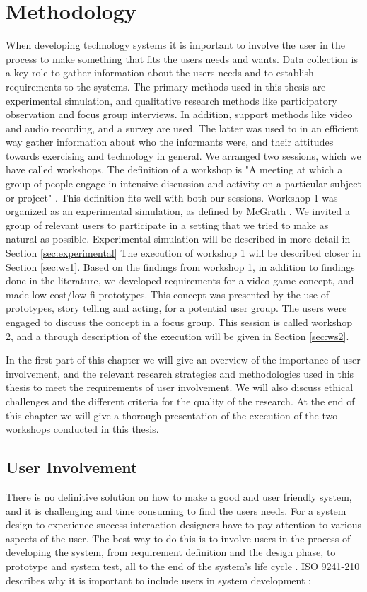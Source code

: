 \chapter{Methodology}
When developing technology systems it is important to involve the user in the process to make something that fits the users needs and wants. Data collection is a key role to gather information about the users needs and to establish requirements to the systems. The primary methods used in this thesis are experimental simulation, and qualitative research methods like participatory observation and focus group interviews. In addition, support methods like video and audio recording, and a survey are used. The latter was used to in an efficient way gather information about  who the informants were, and their attitudes towards exercising and technology in general. We arranged two sessions, which we have called workshops.  The definition of a workshop is "A meeting at which a group of people engage in intensive discussion and activity on a particular subject or project" \cite{dictionary}. This definition fits well with both our sessions. Workshop 1 was organized as an experimental simulation, as defined by McGrath \cite{McGrath}. We invited a group of relevant users to participate in a setting that we tried to make as natural as possible. Experimental simulation will be described in more detail in Section \ref{sec:experimental} The execution of workshop 1 will be described closer in Section \ref{sec:ws1}. Based on the findings from workshop 1, in addition to findings done in the literature, we developed requirements for a video game concept, and made low-cost/low-fi prototypes. This concept was presented by the use of prototypes, story telling and acting, for a potential user group. The users were engaged to discuss the concept in a focus group. This session is called workshop 2, and a through description of the execution will be given in Section \ref{sec:ws2}. 

In the first part of this chapter we will give an overview of the importance of user involvement, and the relevant research strategies and methodologies used in this thesis to meet the requirements of user involvement. We will also discuss ethical challenges and the different criteria for the quality of the research. At the end of this chapter we will give a thorough presentation of the execution of the two workshops conducted in this thesis. 

\section{User Involvement}
There is no definitive solution on how to make a good and user friendly system, and it is challenging and time consuming to find the users needs. For a system design to experience success interaction designers have to pay attention to various aspects of the user. The best way to do this is to involve users in the process of developing the system, from requirement definition and the design phase, to prototype and system test, all to the end of the system's life cycle \cite{mmi}. ISO 9241-210 describes why it is important to include users in system development \cite{dis20109241}:

